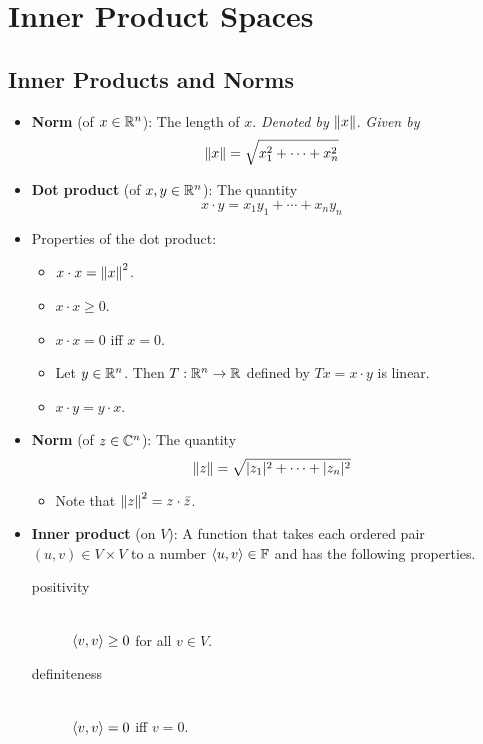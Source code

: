 \documentclass[../main.tex]{subfiles}
\begin{document}
\chapter{Inner Product Spaces}
\section{Inner Products and Norms}
\begin{itemize}
    \item {}\textbf{Norm} (of $x\in\mathbb{R}^n$): The length of $x$. \emph{Denoted by} $\norm{x}$. \emph{Given by}
    \begin{equation*}
        \norm{x} = \sqrt{x_1^2+\cdots+x_n^2}
    \end{equation*}
    \item \textbf{Dot product} (of $x,y\in\mathbb{R}^n$): The quantity
    \begin{equation*}
        x\cdot y = x_1y_1+\cdots+x_ny_n
    \end{equation*}
    \item Properties of the dot product:
    \begin{itemize}
        \item $x\cdot x=\norm{x}^2$.
        \item $x\cdot x\geq 0$.
        \item $x\cdot x=0$ iff $x=0$.
        \item Let $y\in\mathbb{R}^n$. Then $T:\mathbb{R}^n\to\mathbb{R}$ defined by $Tx=x\cdot y$ is linear.
        \item $x\cdot y=y\cdot x$.
    \end{itemize}
    \item \textbf{Norm} (of $z\in\mathbb{C}^n$): The quantity
    \begin{equation*}
        \norm{z} = \sqrt{|z_1|^2+\cdots+|z_n|^2}
    \end{equation*}
    \begin{itemize}
        \item Note that $\norm{z}^2=z\cdot\bar{z}$.
    \end{itemize}
    \item \textbf{Inner product} (on $V$): A function that takes each ordered pair $(u,v)\in V\times V$ to a number $\left\langle{u},{v}\right\rangle\in\mathbb{F}$ and has the following properties.
    \begin{description}
        \item[positivity] \hfill\\ $\left\langle{v},{v}\right\rangle\geq 0$ for all $v\in V$.
        \item[definiteness] \hfill\\ $\left\langle{v},{v}\right\rangle=0$ iff $v=0$.

\end{description}
\end{itemize}
\end{document}
